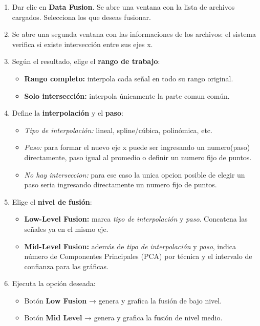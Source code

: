 \documentclass[12pt]{article}
\begin{document}
    \begin{enumerate}
      \item Dar clic en \textbf{Data Fusion}. Se abre una ventana con la lista de archivos cargados. 
            Selecciona los que deseas fusionar.
      \item Se abre una segunda ventana con las informaciones de los archivos:
            el sistema verifica si existe intersección entre sus ejes x.
      \item Según el resultado, elige el \textbf{rango de trabajo}:
            \begin{itemize}
              \item \textbf{Rango completo:} interpola cada señal en todo su rango original.
              \item \textbf{Solo intersección:} interpola únicamente la parte comun común.
            \end{itemize}
      \item Define la \textbf{interpolación} y el \textbf{paso}:
            \begin{itemize}
              \item \textit{Tipo de interpolación:} lineal, spline/cúbica, polinómica, etc.
              \item \textit{Paso:} para formar el nuevo eje x puede ser ingresando un numero(paso) directamente, paso igual al promedio o definir un numero fijo de puntos.
              \item  \textit{No hay interseccion:} para ese caso la unica opcion posible de elegir un paso seria ingresando directamente un numero fijo de puntos.
            \end{itemize}
      \item Elige el \textbf{nivel de fusión}:
            \begin{itemize}
              \item \textbf{Low-Level Fusion:} marca \textit{tipo de interpolación} y \textit{paso}. 
                    Concatena las señales ya en el mismo eje.
              \item \textbf{Mid-Level Fusion:} además de \textit{tipo de interpolación} y \textit{paso}, 
                    indica número de Componentes Principales (PCA) por técnica y el 
                    intervalo de confianza para las gráficas.
            \end{itemize}
      \item Ejecuta la opción deseada:
            \begin{itemize}
              \item Botón \textbf{Low Fusion} → genera y grafica la fusión de bajo nivel.
              \item Botón \textbf{Mid Level} → genera y grafica la fusión de nivel medio.
            \end{itemize}
    \end{enumerate}
    
\end{document}
